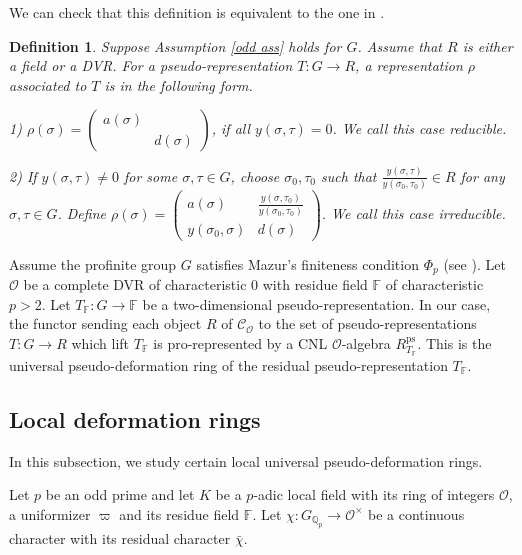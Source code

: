 \documentclass[a4paper, 12pt]{amsart}
\newtheorem{defn}[thm]{Definition} \theoremstyle{remark}
\def\ps{\mathrm{ps}}
\newcommand{\F}{\mathbb{F}}
\newcommand{\Q}{\mathbb{Q}}
\newcommand{\cO}{\mathcal{O}}
\begin{document}
	We can check that this definition is equivalent to the one in \cite[Section 2.4]{Skinner_1999}.
	
	\begin{defn}\label{construction}\cite[2.1.5]{pan2022fontaine}
		Suppose Assumption \ref{odd ass} holds for $G$. Assume that $R$  is either a field or a DVR. For a pseudo-representation $T: G\to R$, a representation $\rho$ associated to $T$ is in the following form.
		
		1) $ \rho(\sigma)=
		\begin{pmatrix}
			a(\sigma) & ~\\
			~& d(\sigma)
		\end{pmatrix}$, if all $y(\sigma, \tau)=0$. We call this case \textit{reducible}.
		
		2) If $y(\sigma, \tau) \ne 0 $ for some $ \sigma, \tau \in G$, choose $\sigma_0, \tau_0$ such that $\frac{y(\sigma, \tau)}{y(\sigma_0, \tau_0)} \in R$ for any $ \sigma, \tau \in G$. Define $ \rho(\sigma)=
		\begin{pmatrix}
			a(\sigma) & \frac{y(\sigma, \tau_0)}{y(\sigma_0, \tau_0)}\\
			y(\sigma_0, \sigma)& d(\sigma)
		\end{pmatrix}$.  We call this case \textit{irreducible}.
	\end{defn}
	
	Assume the profinite group $G$ satisfies Mazur's finiteness condition $\Phi_p$ (see \cite[2.1.2 Assumption 1]{pan2022fontaine}). Let $\mathcal{O}$ be a complete DVR of characteristic $0$ with residue field $\mathbb{F}$ of characteristic $p>2$. Let $T_\F: G \to \mathbb{F}$ be a two-dimensional pseudo-representation. In our case, the functor sending each object $R$ of $\mathcal{C}_{\mathcal{O}}$ to the set of pseudo-representations $T: G \to R$ which lift $T_\F$ is pro-represented by a CNL $\cO$-algebra $R^{\ps}_{T_\F}$. This is the universal pseudo-deformation ring of the residual pseudo-representation $T_\F$.
	
	\subsection{Local deformation rings}
	
	In this subsection, we study certain local universal pseudo-deformation rings.
	
	Let $p$ be an odd prime and let $K$ be a $p$-adic local field with its ring of integers $\mathcal{O}$, a uniformizer $\varpi$ and its residue field $\mathbb{F}$. Let $\chi :G_{\Q_p} \to \mathcal{O}^\times$ be a continuous character with its residual character $\bar{\chi}$.
	
\end{document}
